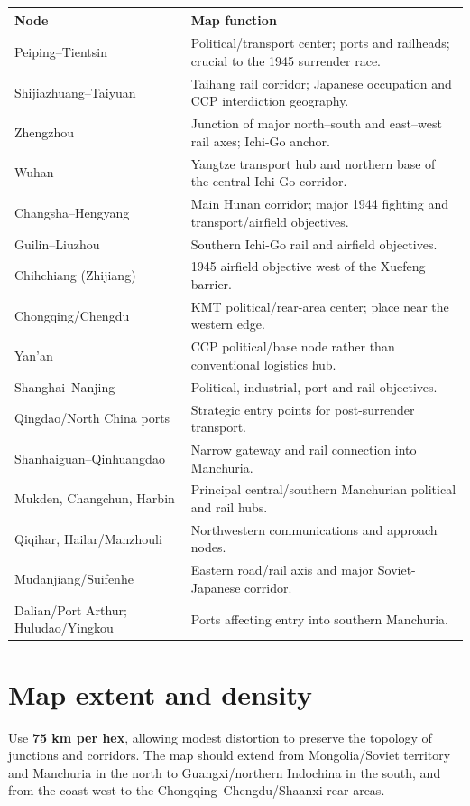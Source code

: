 \documentclass[11pt]{article}
\begin{document}
\begin{longtable}{p{}p{}}
\toprule Node & Map function \\\midrule\endhead
Peiping--Tientsin & Political/transport center; ports and railheads; crucial to the 1945 surrender race.\\
Shijiazhuang--Taiyuan & Taihang rail corridor; Japanese occupation and CCP interdiction geography.\\
Zhengzhou & Junction of major north--south and east--west rail axes; Ichi-Go anchor.\\
Wuhan & Yangtze transport hub and northern base of the central Ichi-Go corridor.\\
Changsha--Hengyang & Main Hunan corridor; major 1944 fighting and transport/airfield objectives.\\
Guilin--Liuzhou & Southern Ichi-Go rail and airfield objectives.\\
Chihchiang (Zhijiang) & 1945 airfield objective west of the Xuefeng barrier.\\
Chongqing/Chengdu & KMT political/rear-area center; place near the western edge.\\
Yan'an & CCP political/base node rather than conventional logistics hub.\\
Shanghai--Nanjing & Political, industrial, port and rail objectives.\\
Qingdao/North China ports & Strategic entry points for post-surrender transport.\\
Shanhaiguan--Qinhuangdao & Narrow gateway and rail connection into Manchuria.\\
Mukden, Changchun, Harbin & Principal central/southern Manchurian political and rail hubs.\\
Qiqihar, Hailar/Manzhouli & Northwestern communications and approach nodes.\\
Mudanjiang/Suifenhe & Eastern road/rail axis and major Soviet-Japanese corridor.\\
Dalian/Port Arthur; Huludao/Yingkou & Ports affecting entry into southern Manchuria.\\
\bottomrule
\end{longtable}

\section{Map extent and density}
Use \textbf{75 km per hex}, allowing modest distortion to preserve the topology of junctions and corridors. The map should extend from Mongolia/Soviet territory and Manchuria in the north to Guangxi/northern Indochina in the south, and from the coast west to the Chongqing--Chengdu/Shaanxi rear areas.
\end{document}
